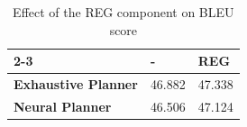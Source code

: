\begin{table}[h]
\begin{center}
\begin{tabular}{l|l|l|}
\cline{2-3}
 & \textbf{-} & \textbf{REG} \\ \hline
\multicolumn{1}{|l|}{\textbf{Exhaustive Planner}} & 46.882 & 47.338 \\ \hline
\multicolumn{1}{|l|}{\textbf{Neural Planner}} & 46.506 & 47.124 \\ \hline
\end{tabular}
\end{center}
\caption{Effect of the REG component on BLEU score}
\label{table:bleu-reg}
\end{table}